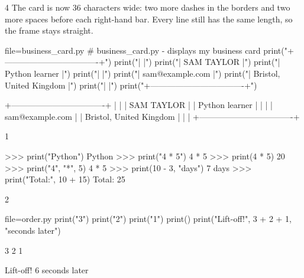 \begin{corrigeatoi}{4}
The card is now 36 characters wide: two more dashes in the borders and two more spaces before each
right-hand bar. Every line still has the same length, so the frame stays straight.
\begin{code}{file=business_card.py}
# business_card.py - displays my business card
print("+----------------------------------+")
print("|                                  |")
print("|   SAM TAYLOR                     |")
print("|   Python learner                 |")
print("|                                  |")
print("|   sam@example.com                |")
print("|   Bristol, United Kingdom        |")
print("|                                  |")
print("+----------------------------------+")
\end{code}
\begin{sortie}
+----------------------------------+
|                                  |
|   SAM TAYLOR                     |
|   Python learner                 |
|                                  |
|   sam@example.com                |
|   Bristol, United Kingdom        |
|                                  |
+----------------------------------+
\end{sortie}
\end{corrigeatoi}

\begin{corrige}{1}
\begin{console}
>>> print("Python")
Python
>>> print("4 * 5")
4 * 5
>>> print(4 * 5)
20
>>> print("4", "*", 5)
4 * 5
>>> print(10 - 3, "days")
7 days
>>> print("Total:", 10 + 15)
Total: 25
\end{console}
\end{corrige}

\begin{corrige}{2}
\begin{code}{file=order.py}
print("3")
print("2")
print("1")
print()
print("Lift-off!", 3 + 2 + 1, "seconds later")
\end{code}
\begin{sortie}
3
2
1

Lift-off! 6 seconds later
\end{sortie}
\end{corrige}

